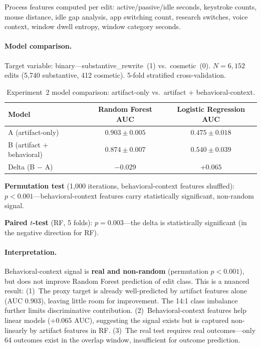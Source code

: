 \documentclass[11pt]{article}
\begin{document}
Process features computed per edit: active/passive/idle seconds, keystroke counts, mouse distance, idle gap analysis, app switching count, research switches, voice context, window dwell entropy, window category seconds.

\paragraph{Model comparison.}
Target variable: binary---substantive\_rewrite~(1) vs.\ cosmetic~(0).
$N=6{,}152$ edits (5{,}740 substantive, 412 cosmetic).
5-fold stratified cross-validation.

\begin{table}[h]
\centering
\caption{Experiment~2 model comparison: artifact-only vs.\ artifact + behavioral-context.}
\label{tab:exp2-results}
\begin{tabular}{@{}lcc@{}}
\toprule
\textbf{Model} & \textbf{Random Forest AUC} & \textbf{Logistic Regression AUC} \\
\midrule
A (artifact-only)              & $\mathbf{0.903 \pm 0.005}$ & $0.475 \pm 0.018$ \\
B (artifact + behavioral)      & $0.874 \pm 0.007$          & $\mathbf{0.540 \pm 0.039}$ \\
\midrule
Delta (B $-$ A)                & $-0.029$                   & $+0.065$ \\
\bottomrule
\end{tabular}
\end{table}

\textbf{Permutation test} (1{,}000 iterations, behavioral-context features shuffled): $p < 0.001$---behavioral-context features carry statistically significant, non-random signal.

\textbf{Paired $t$-test} (RF, 5 folds): $p = 0.003$---the delta is statistically significant (in the negative direction for RF).

\paragraph{Interpretation.}
Behavioral-context signal is \textbf{real and non-random} (permutation $p < 0.001$), but does not improve Random Forest prediction of edit class.
This is a nuanced result:
(1)~The proxy target is already well-predicted by artifact features alone (AUC 0.903), leaving little room for improvement.
The 14:1 class imbalance further limits discriminative contribution.
(2)~Behavioral-context features help linear models ($+0.065$ AUC), suggesting the signal exists but is captured non-linearly by artifact features in RF.
(3)~The real test requires real outcomes---only 64 outcomes exist in the overlap window, insufficient for outcome prediction.
\end{document}
